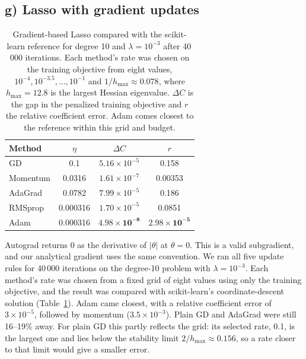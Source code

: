 \documentclass[aps,prb,reprint,superscriptaddress,nofootinbib,longbibliography,floatfix]{revtex4-2}
\begin{document}
\subsection{g) Lasso with gradient updates}\label{sec:res_lasso}
\begin{table}[tb]
\caption{Gradient-based Lasso compared with the scikit-learn reference for degree 10 and $\lambda=10^{-3}$ after 40\,000 iterations. Each method's rate was chosen on the training objective from eight values, $10^{-4},10^{-3.5},\dots,10^{-1}$ and $1/h_{\max}\approx0.078$, where $h_{\max}=12.8$ is the largest Hessian eigenvalue. $\Delta C$ is the gap in the penalized training objective and $r$ the relative coefficient error. Adam comes closest to the reference within this grid and budget.}\label{tab:lasso}
\begin{ruledtabular}
\begin{tabular}{lccc}
Method & $\eta$ & $\Delta C$ & $r$ \\ \hline
GD & 0.1 & $5.16\times10^{-5}$ & 0.158 \\
Momentum & 0.0316 & $1.61\times10^{-7}$ & 0.00353 \\
AdaGrad & 0.0782 & $7.99\times10^{-5}$ & 0.186 \\
RMSprop & 0.000316 & $1.70\times10^{-5}$ & 0.0851 \\
Adam & 0.000316 & $\mathbf{4.98\times10^{-8}}$ & $\mathbf{2.98\times10^{-5}}$ \\
\end{tabular}
\end{ruledtabular}
\end{table}

Autograd returns 0 as the derivative of $|\theta|$ at $\theta=0$. This is a valid subgradient, and our analytical gradient uses the same convention. We ran all five update rules for 40\,000 iterations on the degree-10 problem with $\lambda=10^{-3}$. Each method's rate was chosen from a fixed grid of eight values using only the training objective, and the result was compared with scikit-learn's coordinate-descent solution (Table~\ref{tab:lasso}). Adam came closest, with a relative coefficient error of $3\times10^{-5}$, followed by momentum ($3.5\times10^{-3}$). Plain GD and AdaGrad were still 16--19\% away. For plain GD this partly reflects the grid: its selected rate, 0.1, is the largest one and lies below the stability limit $2/h_{\max}\approx0.156$, so a rate closer to that limit would give a smaller error.
\end{document}

